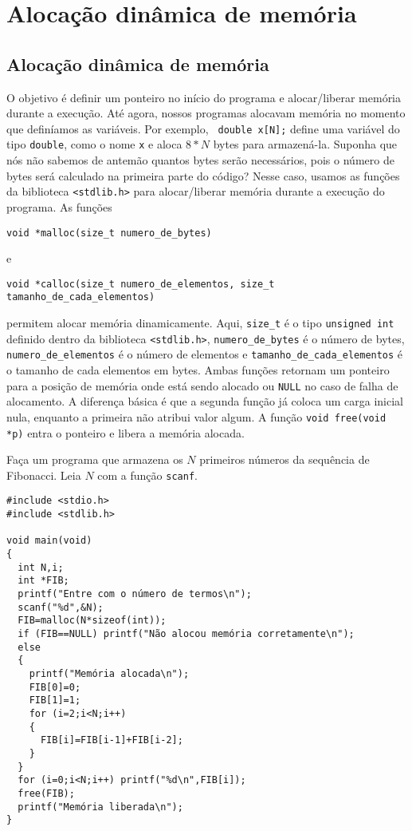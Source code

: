 

\chapter{Alocação dinâmica de memória}
\section{Alocação dinâmica de memória}
O objetivo é definir um ponteiro no início do programa e alocar/liberar memória durante a execução. Até agora, nossos programas alocavam memória no momento que definíamos as variáveis. Por exemplo, \verb| double x[N];| define uma variável do tipo \verb|double|, como o nome \verb|x| e aloca $8*N$ bytes para armazená-la. Suponha que nós não sabemos de antemão quantos bytes serão necessários, pois o número de bytes será calculado na primeira parte do código? Nesse caso, usamos as funções da biblioteca \verb|<stdlib.h>| para alocar/liberar memória durante a execução do programa. As funções
\begin{verbatim}
void *malloc(size_t numero_de_bytes)
\end{verbatim}
e
\begin{verbatim}
void *calloc(size_t numero_de_elementos, size_t tamanho_de_cada_elementos)
\end{verbatim}
permitem alocar memória dinamicamente. Aqui, \verb|size_t| é o tipo \verb|unsigned int| definido dentro da biblioteca \verb|<stdlib.h>|, \verb|numero_de_bytes| é o número de bytes, \verb|numero_de_elementos| é o número de elementos e \verb|tamanho_de_cada_elementos| é o tamanho de cada elementos em bytes. Ambas funções retornam um ponteiro para a posição de memória onde está sendo alocado ou \verb|NULL| no caso de falha de alocamento. A diferença básica é que a segunda função já coloca um carga inicial nula, enquanto a primeira não atribui valor algum. A função \verb|void free(void *p)| entra o ponteiro e libera a memória alocada.
\begin{ex}
Faça um programa que armazena os $N$ primeiros números da sequência de Fibonacci. Leia $N$ com a função \verb|scanf|.
\end{ex}
\begin{verbatim}
#include <stdio.h>
#include <stdlib.h>

void main(void)
{
  int N,i;
  int *FIB;
  printf("Entre com o número de termos\n");
  scanf("%d",&N);
  FIB=malloc(N*sizeof(int));
  if (FIB==NULL) printf("Não alocou memória corretamente\n");
  else
  {
    printf("Memória alocada\n");
    FIB[0]=0;
    FIB[1]=1;
    for (i=2;i<N;i++)
    {
      FIB[i]=FIB[i-1]+FIB[i-2];
    }
  }
  for (i=0;i<N;i++) printf("%d\n",FIB[i]);
  free(FIB);
  printf("Memória liberada\n");
}
\end{verbatim}

